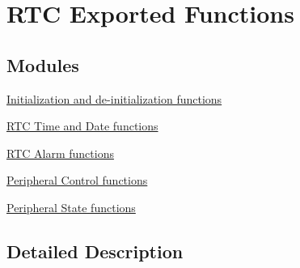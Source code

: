 \hypertarget{group___r_t_c___exported___functions}{}\section{R\+TC Exported Functions}
\label{group___r_t_c___exported___functions}
\subsection*{Modules}
\begin{DoxyCompactItemize}
\item 
\hyperlink{group___r_t_c___exported___functions___group1}{Initialization and de-\/initialization functions}
\item 
\hyperlink{group___r_t_c___exported___functions___group2}{R\+T\+C Time and Date functions}
\item 
\hyperlink{group___r_t_c___exported___functions___group3}{R\+T\+C Alarm functions}
\item 
\hyperlink{group___r_t_c___exported___functions___group4}{Peripheral Control functions}
\item 
\hyperlink{group___r_t_c___exported___functions___group5}{Peripheral State functions}
\end{DoxyCompactItemize}


\subsection{Detailed Description}
